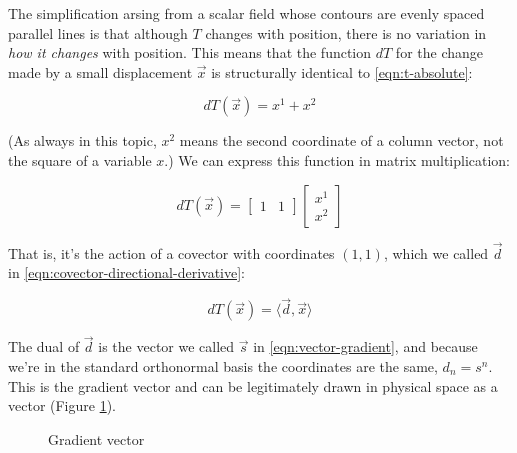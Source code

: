 The simplification arsing from a scalar field whose contours are evenly spaced parallel lines is that although $T$ changes with position, there is no variation in \textit{how it changes} with position. This means that the function $dT$ for the change made by a small displacement $\vec{x}$ is structurally identical to \eqref{eqn:t-absolute}:

\begin{equation}
    dT(\vec{x}) = x^1 + x^2
    \label{eqn:t-rel}
\end{equation}

(As always in this topic, $x^2$ means the second coordinate of a column vector, not the square of a variable $x$.) We can express this function in matrix multiplication:

\begin{equation}
    dT(\vec{x}) = 
    \begin{bmatrix}1 & 1\end{bmatrix}
    \begin{bmatrix}x^1 \\ x^2\end{bmatrix}
    \label{eqn:t-rel-matrices}
\end{equation}

That is, it's the action of a covector with coordinates $(1, 1)$, which we called $\vec{d}$ in \eqref{eqn:covector-directional-derivative}:

$$
dT(\vec{x}) = \langle \vec{d}, \vec{x} \rangle
$$

The dual of $\vec{d}$ is the vector we called $\vec{s}$ in \eqref{eqn:vector-gradient}, and because we're in the standard orthonormal basis the coordinates are the same, $d_n = s^n$. This is the gradient vector and can be legitimately drawn in physical space as a vector (Figure \ref{fig:gradient-vector}).

\begin{figure}[h]
    \caption{Gradient vector}
    \centering
    \label{fig:gradient-vector}
\end{figure}

